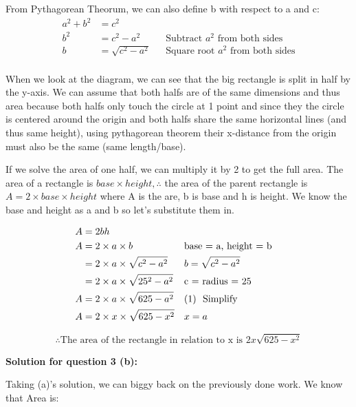 \documentclass[12pt]{book}
\begin{document}
\begin{enumerate}
From Pythagorean Theorum, we can also define b with respect to a and c:
\begin{align*}
    a^2 + b^2 &= c^2 \\
    b^2 &= c^2 - a^2 && \text{Subtract } a^2 \text{ from both sides}\\
    b &= \sqrt{c^2 - a^2} && \text{Square root } a^2 \text{ from both sides}\\
\end{align*}

\vspace{-0.5cm}
When we look at the diagram, we can see that the big rectangle is split in 
half by the y-axis. We can assume that both halfs are of the same dimensions 
and thus area because both halfs only touch the circle at 1 point and since 
they the circle is centered around the origin and both halfs share the same 
horizontal lines (and thus same height), using pythagorean theorem their 
x-distance from the origin must also be the same (same length/base).

\vspace{0.3cm}
If we solve the area of one half, we can multiply it by 2 to get the full area. 
The area of a rectangle is $base \times height, \therefore$ the area of the parent rectangle 
is $A = 2\times base \times height$ where A is the are, b is base and h is height. We know the base and height as a and b 
so let's substitute them in. 

\begin{align*}
    A &= 2bh \\
    A &= 2\times a \times b && \text{base = a, height = b} \\
    &= 2\times a \times \sqrt{c^2 - a^2} && b = \sqrt{c^2 - a^2} \\
    &= 2\times a \times \sqrt{25^2 - a^2} && \text{c = radius = 25} \\
    A &= 2\times a \times \sqrt{625 - a^2} && \text{(1) \space Simplify} \\
    A &= 2\times x \times \sqrt{625 - x^2} && x=a \\
\end{align*}

\vspace{-1cm}
$$\boxed{\therefore \text{The area of the rectangle in relation to x is } 2x\sqrt{625 - x^2}}$$

\vspace{0.5cm}
\textbf{Solution for question 3 (b):}

\vspace{0.3cm}
Taking (a)'s solution, we can biggy back on the previously done work. We know that 
Area is:


\end{enumerate}
\end{document}
